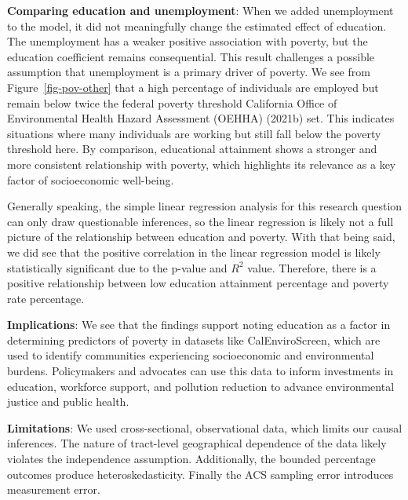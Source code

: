 \documentclass[
  letterpaper,
  DIV=11,
  numbers=noendperiod]{scrartcl}
\begin{document}
\textbf{Comparing education and unemployment}: When we added
unemployment to the model, it did not meaningfully change the estimated
effect of education. The unemployment has a weaker positive association
with poverty, but the education coefficient remains consequential. This
result challenges a possible assumption that unemployment is a primary
driver of poverty. We see from Figure~\ref{fig-pov-other} that a high
percentage of individuals are employed but remain below twice the
federal poverty threshold California Office of Environmental Health
Hazard Assessment (OEHHA) (2021b) set. This indicates situations where
many individuals are working but still fall below the poverty threshold
here. By comparison, educational attainment shows a stronger and more
consistent relationship with poverty, which highlights its relevance as
a key factor of socioeconomic well-being.

Generally speaking, the simple linear regression analysis for this
research question can only draw questionable inferences, so the linear
regression is likely not a full picture of the relationship between
education and poverty. With that being said, we did see that the
positive correlation in the linear regression model is likely
statistically significant due to the p-value and \(R^2\) value.
Therefore, there is a positive relationship between low education
attainment percentage and poverty rate percentage.

\textbf{Implications}: We see that the findings support noting education
as a factor in determining predictors of poverty in datasets like
CalEnviroScreen, which are used to identify communities experiencing
socioeconomic and environmental burdens. Policymakers and advocates can
use this data to inform investments in education, workforce support, and
pollution reduction to advance environmental justice and public health.

\textbf{Limitations}: We used cross-sectional, observational data, which
limits our causal inferences. The nature of tract-level geographical
dependence of the data likely violates the independence assumption.
Additionally, the bounded percentage outcomes produce
heteroskedasticity. Finally the ACS sampling error introduces
measurement error.
\end{document}

